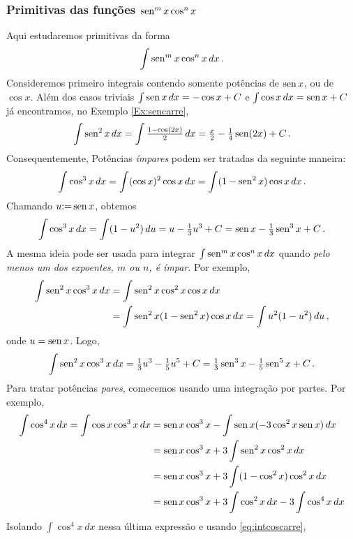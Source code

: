 \subsubsection{Primitivas das funções $\operatorname{sen}^mx\cos^nx$}\label{Sec:primsincos}
Aqui estudaremos primitivas da forma
$$\int \operatorname{sen}^mx\cos^nx\,dx\,.$$
Consideremos primeiro integrais contendo somente potências de $\operatorname{sen} x$, ou de
$\cos x$. Além dos casos triviais $\int \operatorname{sen} x\,dx=-\cos x+C$ e $\int \cos
x\,dx=\operatorname{sen} x+C$ já encontramos, no Exemplo \ref{Ex:sencarre},
$$\int\operatorname{sen}^2x\,dx=\int \tfrac{1-\cos(2x)}{2}\,dx=
\tfrac{x}{2}-\tfrac14 \operatorname{sen}(2x)+C\,.$$ 
Consequentemente,
Potências \emph{ímpares} podem ser tratadas da seguinte maneira:
$$
\int \cos^3x\,dx=\int (\cos x)^2 \cos x\,dx=\int (1-\operatorname{sen}^2x)\cos x\,dx\,.
$$
Chamando $u{:=} \operatorname{sen} x$, obtemos
$$
\int \cos^3x\,dx=\int (1-u^2)\,du=u-\tfrac13 u^3+C=\operatorname{sen} x-\tfrac13\operatorname{sen}^3x+C\,.
$$
A mesma ideia pode ser usada para integrar
$\int \operatorname{sen}^mx\cos^nx\,dx$ quando \emph{pelo menos um dos expoentes, $m$ ou $n$,
é ímpar}. Por exemplo, 
\begin{align*}
\int \operatorname{sen}^2x\cos^3x\,dx&= \int \operatorname{sen}^2x\cos^2x\cos x\,dx\\
&=\int \operatorname{sen}^2x(1-\operatorname{sen}^2x)\cos x\,dx=\int u^2(1-u^2)\,du\,,
\end{align*}
onde $u=\operatorname{sen} x$. Logo,
$$
\int \operatorname{sen}^2x\cos^3x\,dx=\tfrac13u^3-\tfrac15 u^5+C=
\tfrac13\operatorname{sen}^3x-\tfrac15 \operatorname{sen}^5x+C\,.
$$
Para tratar potências \emph{pares}, comecemos usando uma
integração por partes. Por exemplo,
\begin{align*}
\int \cos^4x\,dx=\int \cos x\cos^3x\,dx&=\operatorname{sen} x\cos^3x-\int \operatorname{sen} x
(-3\cos^2x\operatorname{sen} x)\,dx \\
&=\operatorname{sen} x\cos^3x+3\int \operatorname{sen}^2 x
\cos^2x\,dx \\
&=\operatorname{sen} x\cos^3x+3\int (1-\cos^2x)
\cos^2x\,dx \\
&=\operatorname{sen} x\cos^3x+3\int\cos^2x\,dx
-3\int \cos^4x\,dx \\
\end{align*}
Isolando $\int \cos^4x\,dx$ nessa última expressão e usando
\eqref{eq:intcoscarre},


